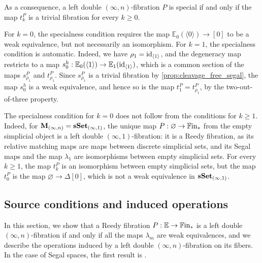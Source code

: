 \documentclass[10pt,reqno]{amsart}
\begin{document}
As a consequence, a left double $(\infty,n)$-fibration $P$ is
special if and only if the map $t_k^P$ is a trivial fibration for
every $k\geq0$.

\begin{rmk}
\label{rem:segality_small_arities}
For $k=0$, the specialness condition requires the map
$\mathbb E_0(\langle0\rangle)\to[0]$ to be a weak equivalence, but
not necessarily an isomorphism. For $k=1$, the specialness condition
is automatic. Indeed, we have $\rho_1=\operatorname{id}_{\langle1\rangle}$, and the
degeneracy map restricts to a map
$s_0^h:\mathbb E_0(\langle1\rangle)\to
\mathbb E_1(\operatorname{id}_{\langle1\rangle})$, which is a common section of the
maps $s_{\rho_1}^P$ and $t_{\rho_1}^P$. Since $s_{\rho_1}^P$ is
a trivial fibration by \cref{prop:cleavage_free_segal}, the map
$s_0^h$ is a weak equivalence, and hence so is the map
$t_1^P=t_{\rho_1}^P$, by the two-out-of-three property.
\end{rmk}

\begin{ex}
\label{ex:empty_left_double}
The specialness condition for $k=0$ does not follow from the
conditions for $k\geq1$. Indeed, for
$\mathbf M_{(\infty,n)}=\mathbf{sSet}_{(\infty,1)}$, the unique map
$P:\varnothing\to\mathbb{F}\mathrm{in}_*$ from the empty simplicial object is a
left double $(\infty,1)$-fibration: it is a Reedy fibration, as its
relative matching maps are maps between discrete simplicial sets, and
its Segal maps and the map $\lambda_1$ are isomorphisms between
empty simplicial sets. For every $k\geq1$, the map $t_k^P$ is an
isomorphism between empty simplicial sets, but the map $t_0^P$ is
the map $\varnothing\to\Delta[0]$, which is not a weak equivalence
in $\mathbf{sSet}_{(\infty,1)}$.
\end{ex}

\subsection{Source conditions and induced operations}

\label{subsec:general_reedy_arguments}

In this section, we show that a Reedy fibration
$P:\mathbb E\to\mathbb{F}\mathrm{in}_*$ is a left double $(\infty,n)$-fibration
if and only if all the maps $\lambda_m$ are weak equivalences, and
we describe the operations induced by a left double
$(\infty,n)$-fibration on its fibers. In the case of Segal spaces,
the first result is \cite[Lemma~3.29]{Rasekh2023Yoneda}.
\end{document}
